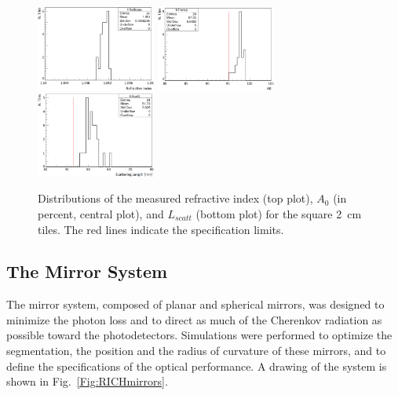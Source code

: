 \documentclass[5p,times,twocolumn]{elsarticle}
\begin{document}
\begin{figure}
\begin{center}
\includegraphics[width=0.35\textwidth]{Aero_Refind.png}
\includegraphics[width=0.35\textwidth]{Aero_A0.png}
\includegraphics[width=0.35\textwidth]{Aero_Lscatt.png}
\caption{Distributions of the measured refractive index (top plot), $A_0$ (in percent, central plot), and $L_{scatt}$
  (bottom plot) for the square 2~cm tiles. The red lines indicate the specification limits.}
\label{Fig:Aerogel_2cm}
\end{center}
\end{figure}


\subsection{The Mirror System}

The mirror system, composed of planar and spherical mirrors, was designed to minimize the photon loss and to direct
as much of the Cherenkov radiation as possible toward the photodetectors. Simulations were performed to optimize
the segmentation, the position and the radius of curvature of these mirrors, and to define the specifications of the
optical performance. A drawing of the system is shown in Fig.~\ref{Fig:RICHmirrors}.
\end{document}
